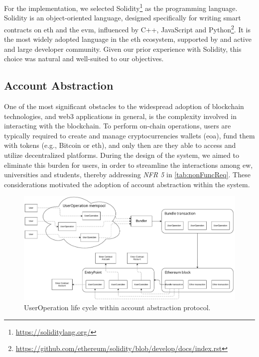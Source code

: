 For the implementation, we selected Solidity\footnote{\url{https://soliditylang.org/}} as the programming language. Solidity is an object-oriented language, designed specifically for writing smart contracts on \acrlong{eth} and the \acrshort{evm}, influenced by C++, JavaScript and Python\footnote{\url{https://github.com/ethereum/solidity/blob/develop/docs/index.rst}}. It is the most widely adopted language in the \acrlong{eth} ecosystem, supported by and active and large developer community. Given our prior experience with Solidity, this choice was natural and well-suited to our objectives.

\subsection{Account Abstraction}
One of the most significant obstacles to the widespread adoption of blockchain technologies, and \gls{web3} applications in general, is the complexity involved in interacting with the blockchain. To perform on-chain operations, users are typically required to create and manage cryptocurrencies wallets (\acrfull{eoa}), fund them with tokens (e.g., Bitcoin or \acrlong{eth}), and only then are they able to access and utilize decentralized platforms. During the design of the system, we aimed to eliminate this burden for users, in order to streamline the interactions among \acrlong{ew}, universities and students, thereby addressing \textit{NFR 5} in \cref{tab:nonFuncReq}. These considerations motivated the adoption of account abstraction within the system.

\begin{figure}
  \centering
  \includegraphics[width=1\textwidth]{figures/Account Abstraction.pdf}
  \caption[UserOperation life cycle within account abstraction protocol]{UserOperation life cycle within account abstraction protocol.}
  \label{fig:accountAbstraction}
\end{figure}

